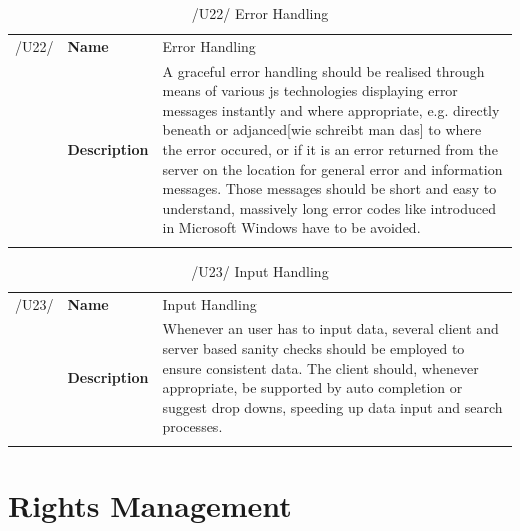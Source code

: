 \documentclass[11pt,a4paper,oneside,svgnames]{report}
\begin{document}
\begin{table}[H]
\centering
\begin{tabular}{llp{8.75cm}}
\cellcolor{white}/U22/	& \textbf{Name}			& Error Handling\\
\cellcolor{white}		& \textbf{Description}	& A graceful error handling should be realised through means of various \gls{js} technologies displaying error messages instantly and where appropriate, e.g. directly beneath or adjanced[wie schreibt man das] to where the error occured, or if it is an error returned from the server on the location for general error and information messages. Those messages should be short and easy to understand, massively long error codes like introduced in Microsoft Windows have to be avoided.\\
\cellcolor{white}		\hfill \\
\end{tabular}
\caption{/U22/ Error Handling}
\label{tab:u22}
\end{table}

\begin{table}[H]
\centering
\begin{tabular}{llp{8.75cm}}
\cellcolor{white}/U23/	& \textbf{Name}			& Input Handling\\
\cellcolor{white}		& \textbf{Description}	& Whenever an user has to input data, several client and server based sanity checks should be employed to ensure consistent data. The client should, whenever appropriate, be supported by auto completion or suggest drop downs, speeding up data input and search processes.\\
\cellcolor{white}		\hfill \\
\end{tabular}
\caption{/U23/ Input Handling}
\label{tab:u23}
\end{table}


\section{Rights Management}
\label{sec:rights-management}
\end{document}
